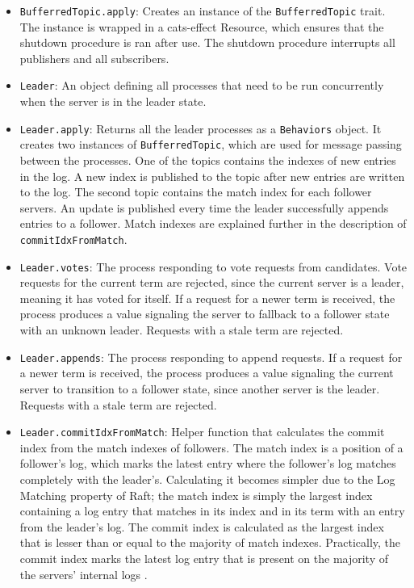 \begin{itemize}
    \item \lstinline|BufferredTopic.apply|: Creates an instance of the \lstinline|BufferredTopic| trait. The instance is wrapped in a cats-effect Resource, which ensures that the shutdown procedure is ran after use. The shutdown procedure interrupts all publishers and all subscribers.
    \item \lstinline|Leader|: An object defining all processes that need to be run concurrently when the server is in the leader state.
    \item \lstinline|Leader.apply|: Returns all the leader processes as a \lstinline|Behaviors| object. It creates two instances of \lstinline|BufferredTopic|, which are used for message passing between the processes. One of the topics contains the indexes of new entries in the log. A new index is published to the topic after new entries are written to the log. The second topic contains the match index for each follower servers. An update is published every time the leader successfully appends entries to a follower. Match indexes are explained further in the description of \lstinline|commitIdxFromMatch|.
    \item \lstinline|Leader.votes|: The process responding to vote requests from candidates. Vote requests for the current term are rejected, since the current server is a leader, meaning it has voted for itself. If a request for a newer term is received, the process produces a value signaling the server to fallback to a follower state with an unknown leader. Requests with a stale term are rejected.
    \item \lstinline|Leader.appends|: The process responding to append requests. If a request for a newer term is received, the process produces a value signaling the current server to transition to a follower state, since another server is the leader. Requests with a stale term are rejected.
    \item \lstinline|Leader.commitIdxFromMatch|: Helper function that calculates the commit index from the match indexes of followers. The match index is a position of a follower's log, which marks the latest entry where the follower's log matches completely with the leader's. Calculating it becomes simpler due to the Log Matching property of Raft; the match index is simply the largest index containing a log entry that matches in its index and in its term with an entry from the leader's log. The commit index is calculated as the largest index that is lesser than or equal to the majority of match indexes. Practically, the commit index marks the latest log entry that is present on the majority of the servers' internal logs \cite{raft}.

\end{itemize}

